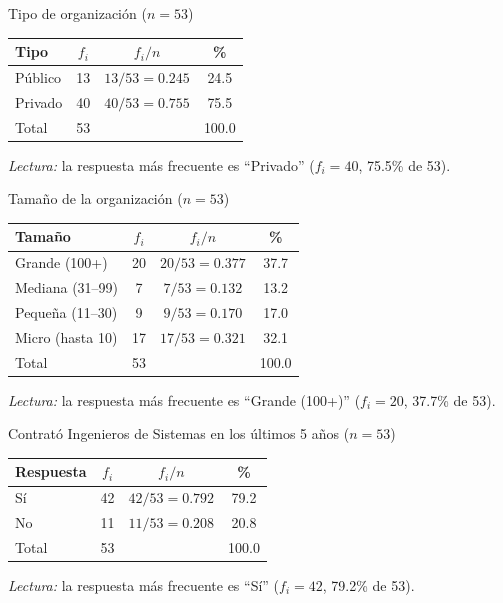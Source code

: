 \begin{mitabla}{Tipo de organización ($n=53$)}
\begin{tabular}{lccc}
\toprule
Tipo & $f_i$ & $f_i / n$ & \% \\
\midrule
Público & 13 & $13/53 = 0.245$ & 24.5 \\
Privado & 40 & $40/53 = 0.755$ & 75.5 \\
\midrule
Total & 53 & & 100.0 \\
\bottomrule
\end{tabular}
\end{mitabla}

\textit{Lectura:} la respuesta más frecuente es ``Privado'' ($f_i = 40$, 75.5\% de 53).

\begin{mitabla}{Tamaño de la organización ($n=53$)}
\begin{tabular}{lccc}
\toprule
Tamaño & $f_i$ & $f_i / n$ & \% \\
\midrule
Grande (100+) & 20 & $20/53 = 0.377$ & 37.7 \\
Mediana (31–99) & 7 & $7/53 = 0.132$ & 13.2 \\
Pequeña (11–30) & 9 & $9/53 = 0.170$ & 17.0 \\
Micro (hasta 10) & 17 & $17/53 = 0.321$ & 32.1 \\
\midrule
Total & 53 & & 100.0 \\
\bottomrule
\end{tabular}
\end{mitabla}

\textit{Lectura:} la respuesta más frecuente es ``Grande (100+)'' ($f_i = 20$, 37.7\% de 53).

\begin{mitabla}{Contrató Ingenieros de Sistemas en los últimos 5 años ($n=53$)}
\begin{tabular}{lccc}
\toprule
Respuesta & $f_i$ & $f_i / n$ & \% \\
\midrule
Sí & 42 & $42/53 = 0.792$ & 79.2 \\
No & 11 & $11/53 = 0.208$ & 20.8 \\
\midrule
Total & 53 & & 100.0 \\
\bottomrule
\end{tabular}
\end{mitabla}

\textit{Lectura:} la respuesta más frecuente es ``Sí'' ($f_i = 42$, 79.2\% de 53).

